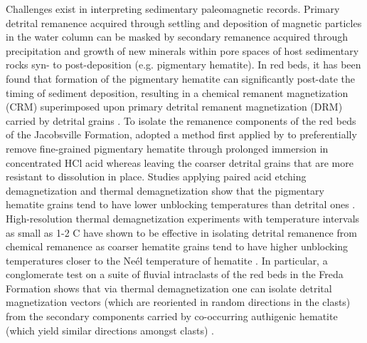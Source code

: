 \documentclass[draft]{agujournal2019}
\begin{document}
Challenges exist in interpreting sedimentary paleomagnetic records. Primary detrital remanence acquired through settling and deposition of magnetic particles in the water column can be masked by secondary remanence acquired through precipitation and growth of new minerals within pore spaces of host sedimentary rocks syn- to post-deposition (e.g. pigmentary hematite). In red beds, it has been found that formation of the pigmentary hematite can significantly post-date the timing of sediment deposition, resulting in a chemical remanent magnetization (CRM) superimposed upon primary detrital remanent magnetization (DRM) carried by detrital grains \cite{Butler1992a}. To isolate the remanence components of the red beds of the Jacobsville Formation,  adopted a method first applied by  to preferentially remove fine-grained pigmentary hematite through prolonged immersion in concentrated HCl acid whereas leaving the coarser detrital grains that are more resistant to dissolution in place. Studies applying paired acid etching demagnetization and thermal demagnetization show that the pigmentary hematite grains tend to have lower unblocking temperatures than detrital ones \cite{Tauxe1980a, Bilardello2010c}. High-resolution thermal demagnetization experiments with temperature intervals as small as 1-2 \textdegree C have shown to be effective in isolating detrital remanence from chemical remanence as coarser hematite grains tend to have higher unblocking temperatures closer to the Ne\'el temperature of hematite \cite{Swanson-Hysell2019b}. In particular, a conglomerate test on a suite of fluvial intraclasts of the red beds in the Freda Formation shows that via thermal demagnetization one can isolate detrital magnetization vectors (which are reoriented in random directions in the clasts) from the secondary components carried by co-occurring authigenic hematite (which yield similar directions amongst clasts) \cite{Swanson-Hysell2019b}. 
\end{document}
